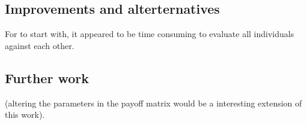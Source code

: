 \subsection{Improvements and alterternatives}
For to start with, it appeared to be time consuming to evaluate all individuals against each other.


\subsection{Further work}
(altering the parameters in the payoff matrix would be a interesting extension of this work).


